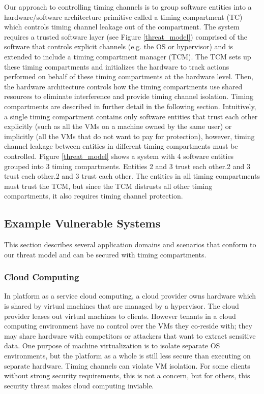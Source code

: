 Our approach to controlling timing channels is to group software entities
into a hardware/software architecture primitive called a timing compartment 
(TC) which controls timing channel leakage out of the compartment. The system 
requires a trusted software layer (see Figure \ref{threat_model}) comprised of 
the software that controls explicit channels (e.g.  the OS or hypervisor) and 
is extended to include a timing compartment manager (TCM). The TCM sets up 
these timing compartments and initializes the hardware to track actions 
performed on behalf of these timing compartments at the hardware level. Then, 
the hardware architecture controls how the timing compartments use shared 
resources to eliminate interference and provide timing channel isolation.  
Timing compartments are described in further detail in the following section.  
Intuitively, a single timing compartment contains only software entities that 
trust each other explicitly (such as all the VMs on a machine owned by the same 
user) or implicitly (all the VMs that do not want to pay for protection), 
however, timing channel leakage between entities in different timing 
compartments must be controlled. Figure \ref{threat_model} shows a system with 
4 software entities grouped into 3 timing compartments. Entities 2 and 3 trust 
each other.2 and 3 trust each other.2 and 3 trust each other. The entities in 
all timing compartments must trust the TCM, but since the TCM distrusts all 
other timing compartments, it also requires timing channel protection.

\subsection{Example Vulnerable Systems}
\label{sec:cloud_scenario}
This section describes several application domains and scenarios that conform 
to our threat model and can be secured with timing compartments.

\subsubsection{Cloud Computing}
In platform as a service cloud computing, a cloud provider owns hardware which 
is shared by virtual machines that are managed by a hypervisor. The cloud 
provider leases out virtual machines to clients. However tenants in a cloud 
computing environment have no control over the VMs they co-reside with; they 
may share hardware with competitors or attackers that want to extract sensitive 
data. One purpose of machine virtualization is to isolate separate OS 
environments, but the platform as a whole is still less secure than executing 
on separate hardware. Timing channels can violate VM isolation. For some 
clients without strong security requirements, this is not a concern, but for 
others, this security threat makes cloud computing inviable.

